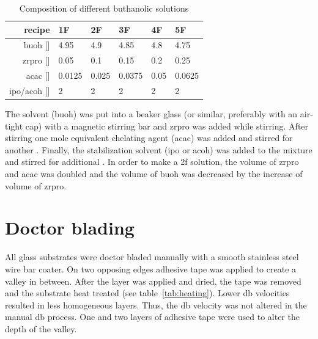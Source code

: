 \begin{table}[h]
	\centering
	\caption{Composition of different buthanolic solutions}
	\label{tab:rec2}
	\begin{tabular}{rlllll}
		\hline
		recipe	&1F		&2F		&3F		&4F		&5F		\\
		\hline
		\gls{buoh} [\ml{}]		&4.95	&4.9	&4.85	&4.8	&4.75	\\
		\gls{zrpro} [\ml{}]	&0.05	&0.1	&0.15	&0.2	&0.25	\\
		\gls{acac} [\ml{}]		&0.0125	&0.025	&0.0375	&0.05	&0.0625	\\
		\gls{ipo}/\gls{acoh} [\ml{}]		&2		&2		&2		&2		&2		\\
		\hline
	\end{tabular}
\end{table}

The solvent (\gls{buoh}) was put into a beaker glass (or similar, preferably with an 
air-tight cap) with a magnetic stirring bar and \gls{zrpro} was added while stirring. After 
stirring  one mole equivalent chelating agent (\gls{acac}) was 
added and stirred for another . Finally, the stabilization 
solvent\cite{Hu2016} (\gls{ipo} or \gls{acoh}) was added to the mixture and stirred for 
additional . 
In order to make a \gls{2f} solution, the volume of \gls{zrpro} and \gls{acac} was 
doubled and the volume of \gls{buoh} was decreased by the increase of volume of \gls{zrpro}. 

\section{Doctor blading}
\label{sec:exp-db}
All glass substrates were doctor bladed manually with a smooth stainless steel wire bar coater. 
On two opposing edges adhesive tape was applied to create a valley in between. 
After the layer was applied and dried, the tape was removed and the substrate heat treated (see table~\ref{tab:heating}).
Lower \gls{db} velocities resulted in less homogeneous layers.
Thus, the \gls{db} velocity was not altered in the manual \gls{db} process. 
One and two layers of adhesive tape were used to alter the depth of the valley. 


